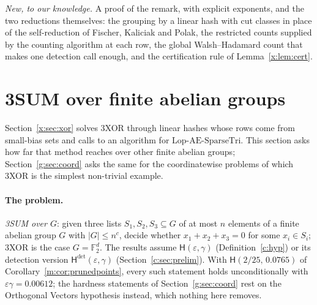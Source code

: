 \documentclass[11pt]{article}
\theoremstyle{definition}
\theoremstyle{remark}
\newcommand{\F}{\mathbb{F}_2}
\newcommand{\Lop}{\mathrm{Lop}\text{-}\allowbreak\mathrm{AE}\text{-}\allowbreak\mathrm{SparseTri}}
\newcommand{\eps}{\varepsilon}
\newcommand{\Hyp}{\mathsf{H}}
\newcommand{\EpsGammaBest}{0.00612}%
\newcommand{\HypPrunedEps}{2/25}%
\newcommand{\HypPrunedGamma}{0.0765}%
\begin{document}
\emph{New, to our knowledge.} A proof of the remark, with explicit exponents, and the two reductions themselves: the grouping by a linear hash with cut classes in place of the self-reduction of Fischer, Kaliciak and Polak, the restricted counts supplied by the counting algorithm at each row, the global Walsh--Hadamard count that makes one detection call enough, and the certification rule of Lemma~\ref{x:lem:cert}.

\section{3SUM over finite abelian groups}\label{g:sec:groups}

Section~\ref{x:sec:xor} solves 3XOR through linear hashes whose rows come from small-bias sets and calls to an algorithm for $\Lop$. This section asks how far that method reaches over other finite abelian groups; Section~\ref{g:sec:coord} asks the same for the coordinatewise problems of which 3XOR is the simplest non-trivial example.

\paragraph{The problem.} \emph{3SUM over $G$}: given three lists $S_1,S_2,S_3\subseteq G$ of at most $n$ elements of a finite abelian group $G$ with $|G|\le n^c$, decide whether $x_1+x_2+x_3=0$ for some $x_i\in S_i$; 3XOR is the case $G=\F^d$. The results assume $\Hyp(\varepsilon,\gamma)$ (Definition~\ref{c:hyp}) or its detection version $\Hyp^{\det}(\varepsilon,\gamma)$ (Section~\ref{c:sec:prelim}). With $\Hyp(\HypPrunedEps,\,\HypPrunedGamma)$ of Corollary~\ref{m:cor:prunedpoints}, every such statement holds unconditionally with $\eps\gamma=\EpsGammaBest$; the hardness statements of Section~\ref{g:sec:coord} rest on the Orthogonal Vectors hypothesis instead, which nothing here removes.
\end{document}
